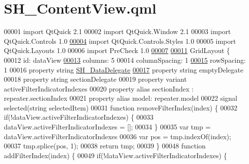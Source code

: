 \hypertarget{SH__ContentView_8qml}{\section{S\-H\-\_\-\-Content\-View.\-qml}
\label{SH__ContentView_8qml}
}

\begin{DoxyCode}
00001 \textcolor{keyword}{import} QtQuick 2.1
00002 import QtQuick.Window 2.1
00003 import QtQuick.Controls 1.0
\hypertarget{SH__ContentView_8qml_source_l00004}{}\hyperlink{classSH__ContentView}{00004} import QtQuick.Controls.Styles 1.0
00005 import QtQuick.Layouts 1.0
00006 import PreCheck 1.0
\hypertarget{SH__ContentView_8qml_source_l00007}{}\hyperlink{classSH__ContentView_a61539dec6a9f22a4bab8fad98231e549}{00007} 
\hypertarget{SH__ContentView_8qml_source_l00011}{}\hyperlink{classSH__ContentView_a5a5fa8f42e23b857494f2c88b39d1177}{00011} GridLayout \{
00012     \textcolor{keywordtype}{id}: dataView
\hypertarget{SH__ContentView_8qml_source_l00013}{}\hyperlink{classSH__ContentView_a7ea5cf24986d3fb77ebcdfc9c3a3822a}{00013}     columns: 5
00014     columnSpacing: 1
\hypertarget{SH__ContentView_8qml_source_l00015}{}\hyperlink{classSH__ContentView_a554c2eaf9b48986c87fa8fb0178c0d1d}{00015}     rowSpacing: 1
00016     \textcolor{keyword}{property} \textcolor{keywordtype}{string} \hyperlink{classSH__DataDelegate}{SH\_DataDelegate}
\hypertarget{SH__ContentView_8qml_source_l00017}{}\hyperlink{classSH__ContentView_ace8288902fb10eb93de67293bc8ac57c}{00017}     \textcolor{keyword}{property} \textcolor{keywordtype}{string} emptyDelegate
00018     \textcolor{keyword}{property} \textcolor{keywordtype}{string} sectionDelegate
00019     \textcolor{keyword}{property} variant activeFilterIndicatorIndexes
00020     \textcolor{keyword}{property} alias sectionIndex : repeater.sectionIndex
00021     \textcolor{keyword}{property} alias model: repeater.model
00022     signal selected(\textcolor{keywordtype}{string} selectedItem)
00031     \textcolor{keyword}{function} removeFilterIndex(index) \{
00032         \textcolor{keywordflow}{if}(!dataView.activeFilterIndicatorIndexes) \{
00033             dataView.activeFilterIndicatorIndexes = [];
00034         \}
00035         var tmp = dataView.activeFilterIndicatorIndexes
00036         var pos = tmp.indexOf(index);
00037         tmp.splice(pos, 1);
00038         \textcolor{keywordflow}{return} tmp;
00039     \}
00048     \textcolor{keyword}{function} addFilterIndex(index) \{
00049         \textcolor{keywordflow}{if}(!dataView.activeFilterIndicatorIndexes) \{

\end{DoxyCode}
